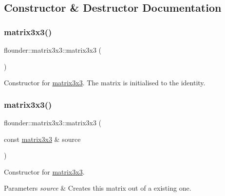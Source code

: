 \subsection{Constructor \& Destructor Documentation}
\mbox{\label{classflounder_1_1matrix3x3_a8cec519a274c98786bd433454631bedc}} 
\subsubsection{\texorpdfstring{matrix3x3()}{matrix3x3()}\hspace{0.1cm}{\footnotesize\ttfamily [1/3]}}
{\footnotesize\ttfamily flounder\+::matrix3x3\+::matrix3x3 (\begin{DoxyParamCaption}{ }\end{DoxyParamCaption})}



Constructor for \hyperlink{classflounder_1_1matrix3x3}{matrix3x3}. The matrix is initialised to the identity. 

\mbox{\label{classflounder_1_1matrix3x3_a792adf7aa264b4008dae571b96575a82}} 
\subsubsection{\texorpdfstring{matrix3x3()}{matrix3x3()}\hspace{0.1cm}{\footnotesize\ttfamily [2/3]}}
{\footnotesize\ttfamily flounder\+::matrix3x3\+::matrix3x3 (\begin{DoxyParamCaption}\item[{const \hyperlink{classflounder_1_1matrix3x3}{matrix3x3} \&}]{source }\end{DoxyParamCaption})}



Constructor for \hyperlink{classflounder_1_1matrix3x3}{matrix3x3}. 


\begin{DoxyParams}{Parameters}
{\em source} & Creates this matrix out of a existing one. \\
\hline
\end{DoxyParams}
\mbox{\label{classflounder_1_1matrix3x3_afcc212e6794a0630818e111cabdcfcf1}} 

